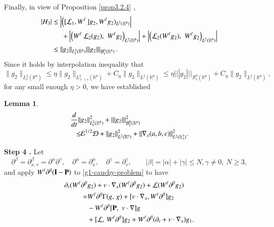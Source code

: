 \documentclass{amsart}[12pt, article]
\newtheorem{lemm}[theo]{Lemma}
\begin{document}
Finally, in view of Proposition \ref{prop3.2.4} ,
\begin{align*}
|H_3|&\le
\left|\Big([{{\mathcal L}}_1,W^\ell \,] g_2,W^\ell
g_2)_{L^2({{{\mathbb R}}}^6)}\right|
\\&\hspace*{0.5cm}+
\left|\Big(W^\ell \,{{\mathcal L}}_2( g_2),\,\,
W^\ell g_2\Big)_{L^2({{{\mathbb R}}}^6)}\right|+
\left|\Big( {{\mathcal L}}_2(W^\ell  g_2),\,\,
W^\ell  g_2\Big)_{L^2({{{\mathbb R}}}^6)}\right|
\\&\le
 \|
g_2\|_{L^2_\ell({{{\mathbb R}}}^6)}|||
g_2|||_{{{\mathcal B}}^0_\ell({{{\mathbb R}}}^6)}\,.
\end{align*}
Since it holds by interpolation inequality that
\begin{equation}\label{norm}
\|g_2\|_{L^2_\ell({{{\mathbb R}}}^6)}\le \eta
\|g_2\|_{L^2_{\ell+s} ({{{\mathbb R}}}^6)}+C_\eta\|g_2\|_{L^2({{{\mathbb R}}}^6)}
\le \eta |||g_2|||_{{{\mathcal B}}^0_\ell({{{\mathbb R}}}^6)}+C_\eta\|g_2\|_{L^2({{{\mathbb R}}}^6)},
\end{equation}
for any small enough $\eta>0$, we have established
\begin{lemm}
\begin{align}\label{microenergy3}
 \frac{d}{dt}\|&g_2\|^2_{L^2_\ell({{{\mathbb R}}}^6)}
+||| g_2 |||^2_{{{\mathcal B}}^0_\ell({{{\mathbb R}}}^6)}
\\ \le&\notag
\mathcal{E}^{1/2}\mathcal{D}+||
g_2||_{L^2({{{\mathbb R}}}^6)}^2
+\|\nabla_x (a,b,c)\|_{L^2({{{\mathbb R}}}^3_x)}^2.
 \end{align}
\end{lemm}
\noindent
{\bf Step 4 .} Let
\[
{{\partial}}^\beta={{\partial}}^\beta_{x,v}={{\partial}}^\alpha {{\partial}}^\gamma,
\quad {{\partial}}^\alpha={{\partial}}_x^\alpha, \quad
{{\partial}}^\gamma={{\partial}}^\gamma_v,\qquad |\beta|=|\alpha|+|\gamma|\le N, \gamma \ne 0,  \ N\ge 3,
\]
and apply $W^\ell{{\partial}}^\beta({{\bf I}}-{{\bf P}})$ to \eqref{g1-cauchy-problem} to have
\begin{align*}
 {{\partial}}_t (W^\ell{{\partial}}^\beta &g_2)+ v\cdot\nabla_x
(W^\ell{{\partial}}^\beta g_2) + {{\mathcal L}} (W^\ell{{\partial}}^\beta g_2)
\\=&\notag
W^\ell{{\partial}}^\beta \Gamma(g,\,g)+
[v\cdot\nabla_x, W^\ell{{\partial}}^\beta]g_2
\\
&- W^\ell {{\partial}}^\beta [{{\bf P}},\,\, v\cdot \nabla]g \notag\\
&+\notag
[\mathcal{L},\, W^\ell{{\partial}}^\beta]g_2
+
W^\ell{{\partial}}^\beta ({{\partial}}_t+v\cdot\nabla_x )g_1.
\end{align*}
\end{document}
